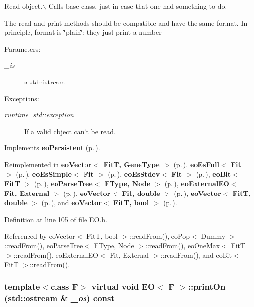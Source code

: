 Read object.$\backslash$ Calls base class, just in case that one had something to do. 

The read and print methods should be compatible and have the same format. In principle, format is \char`\"{}plain\char`\"{}: they just print a number \begin{Desc}
\item[Parameters:]
\begin{description}
\item[{\em \_\-is}]a std::istream. \end{description}
\end{Desc}
\begin{Desc}
\item[Exceptions:]
\begin{description}
\item[{\em runtime\_\-std::exception}]If a valid object can't be read. \end{description}
\end{Desc}


Implements {\bf eo\-Persistent} {\rm (p.\,\pageref{classeo_persistent_a1})}.

Reimplemented in {\bf eo\-Vector$<$ Fit\-T, Gene\-Type $>$} {\rm (p.\,\pageref{classeo_vector_a5})}, {\bf eo\-Es\-Full$<$ Fit $>$} {\rm (p.\,\pageref{classeo_es_full_a3})}, {\bf eo\-Es\-Simple$<$ Fit $>$} {\rm (p.\,\pageref{classeo_es_simple_a3})}, {\bf eo\-Es\-Stdev$<$ Fit $>$} {\rm (p.\,\pageref{classeo_es_stdev_a3})}, {\bf eo\-Bit$<$ Fit\-T $>$} {\rm (p.\,\pageref{classeo_bit_a3})}, {\bf eo\-Parse\-Tree$<$ FType, Node $>$} {\rm (p.\,\pageref{classeo_parse_tree_a6})}, {\bf eo\-External\-EO$<$ Fit, External $>$} {\rm (p.\,\pageref{classeo_external_e_o_a3})}, {\bf eo\-Vector$<$ Fit, double $>$} {\rm (p.\,\pageref{classeo_vector_a5})}, {\bf eo\-Vector$<$ Fit\-T, double $>$} {\rm (p.\,\pageref{classeo_vector_a5})}, and {\bf eo\-Vector$<$ Fit\-T, bool $>$} {\rm (p.\,\pageref{classeo_vector_a5})}.

Definition at line 105 of file EO.h.

Referenced by eo\-Vector$<$ Fit\-T, bool $>$::read\-From(), eo\-Pop$<$ Dummy $>$::read\-From(), eo\-Parse\-Tree$<$ FType, Node $>$::read\-From(), eo\-One\-Max$<$ Fit\-T $>$::read\-From(), eo\-External\-EO$<$ Fit, External $>$::read\-From(), and eo\-Bit$<$ Fit\-T $>$::read\-From().
\subsubsection{\setlength{\rightskip}{0pt plus 5cm}template$<$class F$>$ virtual void {\bf EO}$<$ F $>$::print\-On (std::ostream \& {\em \_\-os}) const\hspace{0.3cm}{\tt  [inline, virtual]}}\label{class_e_o_z10_2}


